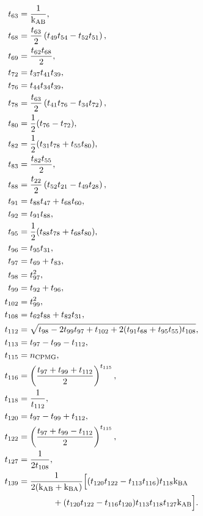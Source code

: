 \begin{latexonly}
\begin{subequations}
\begin{align}
     t_{63} &= \frac{1}{\textrm{k}_\textrm{AB}}, \\
     t_{68} &= \frac{t_{63}}{2} \left(t_{49} t_{54} - t_{52} t_{51} \right), \\
     t_{69} &= \frac{t_{62} t_{68}}{2}, \\
     t_{72} &= t_{37} t_{41} t_{39}, \\
     t_{76} &= t_{44} t_{34} t_{39}, \\
     t_{78} &= \frac{t_{63}}{2} \left(t_{41} t_{76} - t_{34} t_{72} \right), \\
     t_{80} &= \frac{1}{2} (t_{76} - t_{72}), \\
     t_{82} &= \frac{1}{2} (t_{31} t_{78} + t_{55} t_{80}), \\
     t_{83} &= \frac{t_{82} t_{55}}{2}, \\
     t_{88} &= \frac{t_{22}}{2} \left(t_{52} t_{21} - t_{49} t_{28} \right), \\
     t_{91} &= t_{88} t_{47} + t_{68} t_{60}, \\
     t_{92} &= t_{91} t_{88}, \\
     t_{95} &= \frac{1}{2} (t_{88} t_{78} + t_{68} t_{80}), \\
     t_{96} &= t_{95} t_{31}, \\
     t_{97} &= t_{69} + t_{83}, \\
     t_{98} &= t_{97}^2, \\
     t_{99} &= t_{92} + t_{96}, \\
    t_{102} &= t_{99}^2, \\
    t_{108} &= t_{62} t_{88} + t_{82} t_{31}, \\
    t_{112} &= \sqrt{t_{98} - 2 t_{99} t_{97} + t_{102} + 2 (t_{91} t_{68} + t_{95} t_{55}) t_{108}}, \\
    t_{113} &= t_{97} - t_{99} - t_{112}, \\
    t_{115} &= n_\textrm{CPMG}, \\
    t_{116} &= \left( \frac{t_{97} + t_{99} + t_{112}}{2} \right)^{t_{115}}, \\
    t_{118} &= \frac{1}{t_{112}}, \\
    t_{120} &= t_{97} - t_{99} + t_{112}, \\
    t_{122} &= \left( \frac{t_{97} + t_{99} - t_{112}}{2} \right)^{t_{115}}, \\
    t_{127} &= \frac{1}{2 t_{108}}, \\
    t_{139} &= \frac{1}{2(\textrm{k}_\textrm{AB} + \textrm{k}_\textrm{BA})} \Big[ (t_{120} t_{122} - t_{113} t_{116}) t_{118} \textrm{k}_\textrm{BA} \nonumber \\
            & \qquad \qquad                   + (t_{120} t_{122} - t_{116} t_{120}) t_{113} t_{118} t_{127} \textrm{k}_\textrm{AB} \Big].
\end{align}
\end{subequations}
\end{latexonly}

